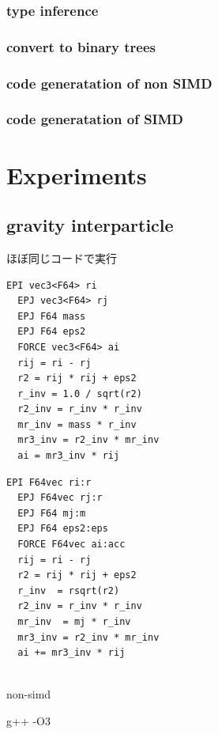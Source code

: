\documentclass[ams, a4j]{U-AizuGT}
\begin{document}
\subsubsection{type inference}
\subsubsection{convert to binary trees}

\subsubsection{code generatation of non SIMD}


\subsubsection{code generatation of SIMD}




  
\section{Experiments}

\subsection{gravity interparticle}
ほぼ同じコードで実行


\begin{lstlisting}[frame=single, caption=Nbody-kernel.pyker, label=Nbody-kernel.pyker]
  EPI vec3<F64> ri
  EPJ vec3<F64> rj
  EPJ F64 mass
  EPJ F64 eps2
  FORCE vec3<F64> ai
  rij = ri - rj
  r2 = rij * rij + eps2
  r_inv = 1.0 / sqrt(r2)
  r2_inv = r_inv * r_inv
  mr_inv = mass * r_inv
  mr3_inv = r2_inv * mr_inv
  ai = mr3_inv * rij
  \end{lstlisting}

\begin{lstlisting}[frame=single, caption=Nbody-kernel.pikg, label=Nbody-kernel.pikg]
  EPI F64vec ri:r
  EPJ F64vec rj:r
  EPJ F64 mj:m
  EPJ F64 eps2:eps
  FORCE F64vec ai:acc
  rij = ri - rj
  r2 = rij * rij + eps2
  r_inv  = rsqrt(r2)
  r2_inv = r_inv * r_inv
  mr_inv  = mj * r_inv
  mr3_inv = r2_inv * mr_inv
  ai += mr3_inv * rij
  
\end{lstlisting}




non-simd

g++ -O3 
\end{document}
